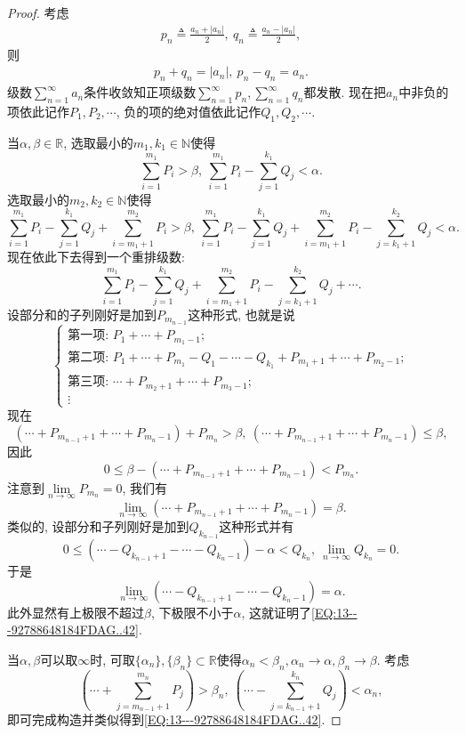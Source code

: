 \documentclass[../../main.tex]{subfiles}
\begin{document}
\begin{proof}
考虑
\begin{align}\label{EQ:13---92788648184FDAG..43}
p_n\triangleq\frac{a_n+|a_n|}{2},\ q_n\triangleq\frac{a_n-|a_n|}{2},
\end{align}
则
\begin{align}\label{EQ:13---92788648184FDAG..44}
p_n+q_n=|a_n|,\ p_n-q_n=a_n.
\end{align}
级数$\sum\limits_{n=1}^{\infty}a_n$条件收敛知正项级数$\sum\limits_{n=1}^{\infty}p_n,\sum\limits_{n=1}^{\infty}q_n$都发散. 现在把$a_n$中非负的项依此记作$P_1,P_2,\cdots$, 负的项的绝对值依此记作$Q_1,Q_2,\cdots$.

当$\alpha,\beta\in\mathbb{R}$, 选取最小的$m_1,k_1\in\mathbb{N}$使得
$$\sum_{i=1}^{m_1}P_i>\beta,\ \sum_{i=1}^{m_1}P_i-\sum_{j=1}^{k_1}Q_j<\alpha.$$
选取最小的$m_2,k_2\in\mathbb{N}$使得
$$\sum_{i=1}^{m_1}P_i-\sum_{j=1}^{k_1}Q_j+\sum_{i=m_1+1}^{m_2}P_i>\beta,\ \sum_{i=1}^{m_1}P_i-\sum_{j=1}^{k_1}Q_j+\sum_{i=m_1+1}^{m_2}P_i-\sum_{j=k_1+1}^{k_2}Q_j<\alpha.$$
现在依此下去得到一个重排级数:
$$\sum_{i=1}^{m_1}P_i-\sum_{j=1}^{k_1}Q_j+\sum_{i=m_1+1}^{m_2}P_i-\sum_{j=k_1+1}^{k_2}Q_j+\cdots.$$
设部分和的子列刚好是加到$P_{m_{n-1}}$这种形式, 也就是说
$$
\begin{cases}
\text{第一项: } P_1+\cdots+P_{m_1-1}; \\
\text{第二项: } P_1+\cdots+P_{m_1}-Q_1-\cdots-Q_{k_1}+P_{m_1+1}+\cdots+P_{m_2-1}; \\
\text{第三项: } \cdots+P_{m_2+1}+\cdots+P_{m_3-1}; \\
\vdots
\end{cases}
$$
现在
$$(\cdots+P_{m_{n-1}+1}+\cdots+P_{m_n-1})+P_{m_n}>\beta,\ (\cdots+P_{m_{n-1}+1}+\cdots+P_{m_n-1})\leqslant\beta,$$
因此
$$0\leqslant\beta-(\cdots+P_{m_{n-1}+1}+\cdots+P_{m_n-1})<P_{m_n}.$$
注意到$\lim\limits_{n\to\infty}P_{m_n}=0$, 我们有
$$\lim\limits_{n\to\infty}(\cdots+P_{m_{n-1}+1}+\cdots+P_{m_n-1})=\beta.$$
类似的, 设部分和子列刚好是加到$Q_{k_{n-1}}$这种形式并有
$$0\leqslant(\cdots-Q_{k_{n-1}+1}-\cdots-Q_{k_n-1})-\alpha<Q_{k_n},\ \lim\limits_{n\to\infty}Q_{k_n}=0.$$
于是
$$\lim\limits_{n\to\infty}(\cdots-Q_{k_{n-1}+1}-\cdots-Q_{k_n-1})=\alpha.$$
此外显然有上极限不超过$\beta$, 下极限不小于$\alpha$, 这就证明了\eqref{EQ:13---92788648184FDAG..42}.

当$\alpha,\beta$可以取$\infty$时, 可取$\{\alpha_n\},\{\beta_n\}\subset\mathbb{R}$使得$\alpha_n<\beta_n,\alpha_n\to\alpha,\beta_n\to\beta$. 考虑
$$\left(\cdots+\sum_{j=m_{n-1}+1}^{m_n}P_j\right)>\beta_n,\ \left(\cdots-\sum_{j=k_{n-1}+1}^{k_n}Q_j\right)<\alpha_n,$$
即可完成构造并类似得到\eqref{EQ:13---92788648184FDAG..42}.

\end{proof}
\end{document}
